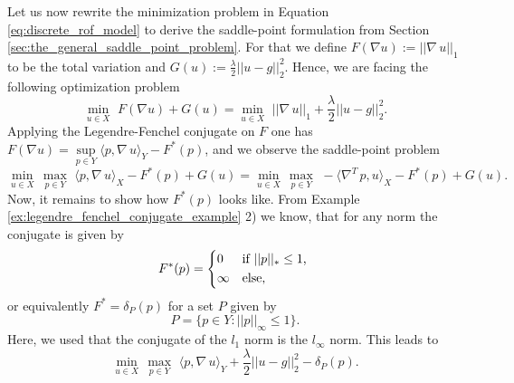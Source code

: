         Let us now rewrite the minimization problem in Equation \ref{eq:discrete_rof_model} to derive the saddle-point formulation from Section \ref{sec:the_general_saddle_point_problem}. For that we define $F(\nabla u) := ||\nabla \, u||_{1}$ to be the total variation and $G(u) := \frac{\lambda}{2} ||u - g||_{2}^{2}$. Hence, we are facing the following optimization problem
            \begin{equation}
                \min_{u \in X}\,\, F(\nabla u) + G(u) = \min_{u \in X}\,\, ||\nabla \, u||_{1} + \frac{\lambda}{2} ||u - g||_{2}^{2}.
            \label{eq:primal_rof_problem}
            \end{equation}
        Applying the Legendre-Fenchel conjugate on $F$ one has $F(\nabla u) = \sup\limits_{p \in Y} \langle p, \nabla \, u \rangle_{Y} - F^{\ast}(p)$, and we observe the saddle-point problem
            \begin{equation}
                \min_{u \in X}\, \max_{p \in Y}\,\, \langle p, \nabla \, u \rangle_{X} - F^{\ast}(p) + G(u) = \min_{u \in X}\, \max_{p \in Y}\,\, -\langle \nabla^{T}\,p, u \rangle_{X} - F^{\ast}(p) + G(u).
            \end{equation}
        Now, it remains to show how $F^{\ast}(p)$ looks like. From Example \ref{ex:legendre_fenchel_conjugate_example} 2) we know, that for any norm the conjugate is given by
            \begin{equation}
                F^{\ast}(p) =
                    \begin{dcases*}
                        0 & \textnormal{if $||p||_{\ast} \le 1$,} \\
                        \infty & \textnormal{else},
                    \end{dcases*}
                \label{eq:rof_f_star}
            \end{equation}
        or equivalently $F^{\ast} = \delta_{P}(p)$ for a set $P$ given by
            \begin{equation}
                P = \big\{ p \in Y : ||p||_{\infty} \le 1 \big\}.
                \label{eq:the_set_P}
            \end{equation}
        Here, we used that the conjugate of the $l_{1}$ norm is the $l_{\infty}$ norm. This leads to
            \begin{equation}
                \min_{u \in X}\, \max_{p \in Y}\,\, \langle p, \nabla\, u \rangle_{Y} + \frac{\lambda}{2} ||u - g||_{2}^{2} - \delta_{P}(p).
            \label{eq:primal_dual_rof_problem}
            \end{equation}
